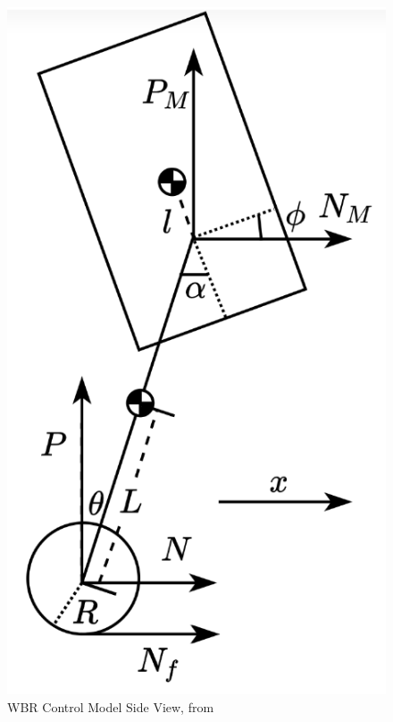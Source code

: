 \documentclass[12pt]{article}
\begin{document}
            \begin{figure}[H]
                \centering
                \includegraphics[width=\textwidth,height=\textheight-300pt,keepaspectratio]{../WBR Control Model Side View.png}
                \caption{WBR Control Model Side View, from \cite{HarbinEngCtrlDesign2022}}
                \label{fig:WBR Control Model Side View}
            \end{figure}
\end{document}
